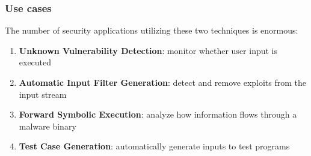 \begin{frame}
	\frametitle{Use cases}
	The number of security applications utilizing these two techniques is enormous:
	\begin{enumerate}
		\item<2-> \textbf{Unknown Vulnerability Detection}: monitor whether user input is executed
		\item<3-> \textbf{Automatic Input Filter Generation}: detect and remove exploits from the input stream
		\item<4-> \textbf{Forward Symbolic Execution}: analyze how information flows through a malware binary
		\item<5-> \textbf{Test Case Generation}: automatically generate inputs to test programs
	\end{enumerate}
\end{frame}